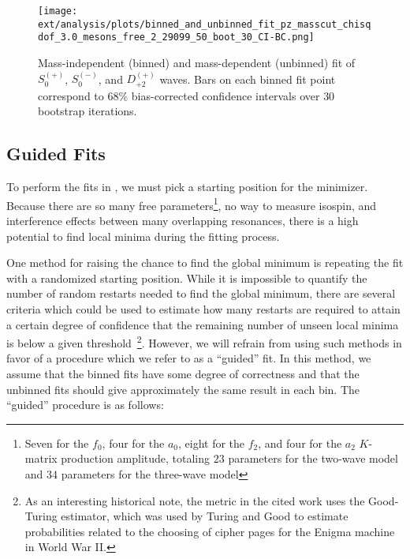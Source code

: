 \begin{figure}
  \begin{center}
    \texttt{[image: ext/analysis/plots/binned\_and\_unbinned\_fit\_pz\_masscut\_chisqdof\_3.0\_mesons\_free\_2\_29099\_50\_boot\_30\_CI-BC.png]}
  \end{center}
  \caption{Mass-independent (binned) and mass-dependent (unbinned) fit of $S_{0}^{(+)}$, $S_{0}^{(-)}$, and $D_{+2}^{(+)}$ waves. Bars on each binned fit point correspond to $68\%$ bias-corrected confidence intervals over $ 30 $ bootstrap iterations.}\label{fig:unbinned-fit-chisqdof-3.0-Spn-D2p}
\end{figure}

\subsection{Guided Fits}\label{sub:guided-fits}

To perform the fits in , we must pick a starting position for the minimizer. Because there are so many free parameters\footnote{Seven for the $f_0$, four for the $a_0$, eight for the $f_2$, and four for the $a_2$ $K$-matrix production amplitude, totaling $23$ parameters for the two-wave model and $34$ parameters for the three-wave model}, no way to measure isospin, and interference effects between many overlapping resonances, there is a high potential to find local minima during the fitting process.

One method for raising the chance to find the global minimum is repeating the fit with a randomized starting position. While it is impossible to quantify the number of random restarts needed to find the global minimum, there are several criteria which could be used to estimate how many restarts are required to attain a certain degree of confidence that the remaining number of unseen local minima is below a given threshold~\cite{Dick2014}\footnote{As an interesting historical note, the metric in the cited work uses the Good-Turing estimator, which was used by Turing and Good to estimate probabilities related to the choosing of cipher pages for the Enigma machine in World War II.}. However, we will refrain from using such methods in favor of a procedure which we refer to as a ``guided'' fit. In this method, we assume that the binned fits have some degree of correctness and that the unbinned fits should give approximately the same result in each bin. The ``guided'' procedure is as follows:

